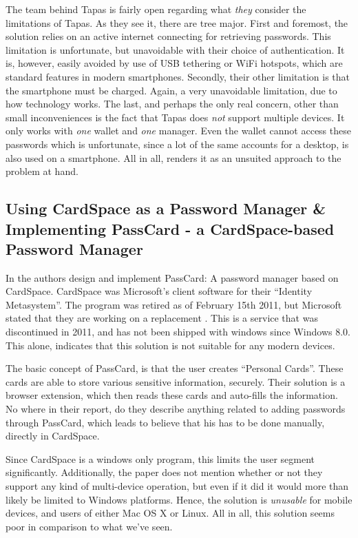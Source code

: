 			The team behind Tapas is fairly open regarding what \emph{they} consider the limitations of Tapas. As they see it, there are tree major. First and foremost, the solution relies on an active internet connecting for retrieving passwords. This limitation is unfortunate, but unavoidable with their choice of authentication. It is, however, easily avoided by use of USB tethering or WiFi hotspots, which are standard features in modern smartphones. Secondly, their other limitation is that the smartphone must be charged. Again, a very unavoidable limitation, due to how technology works. The last, and perhaps the only real concern, other than small inconveniences is the fact that Tapas does \emph{not} support multiple devices. It only works with \emph{one} wallet and  \emph{one} manager. Even the wallet cannot access these passwords which is unfortunate, since a lot of the same accounts for a desktop, is also used on a smartphone. All in all, renders it as an unsuited approach to the problem at hand.

		\subsection*{Using CardSpace as a Password Manager \& Implementing PassCard - a CardSpace-based Password Manager}
			In \cite{cardspace,cardspace_impl} the authors design and implement PassCard: A password manager based on CardSpace. CardSpace was Microsoft's client software for their ``Identity Metasystem''. The program was retired as of February 15th 2011, but Microsoft stated that they are working on a replacement \cite{cardspace_cancelled}. This is a service that was discontinued in 2011, and has not been shipped with windows since Windows 8.0. This alone, indicates that this solution is not suitable for any modern devices.

			The basic concept of PassCard, is that the user creates ``Personal Cards''. These cards are able to store various sensitive information, securely. Their solution is a browser extension, which then reads these cards and auto-fills the information. No where in their report, do they describe anything related to adding passwords through PassCard, which leads to believe that his has to be done manually, directly in CardSpace.

			Since CardSpace is a windows only program, this limits the user segment significantly. Additionally, the paper does not mention whether or not they support any kind of multi-device operation, but even if it did it would more than likely be limited to Windows platforms. Hence, the solution is \emph{unusable} for mobile devices, and users of either Mac OS X or Linux. All in all, this solution seems poor in comparison to what we've seen.

